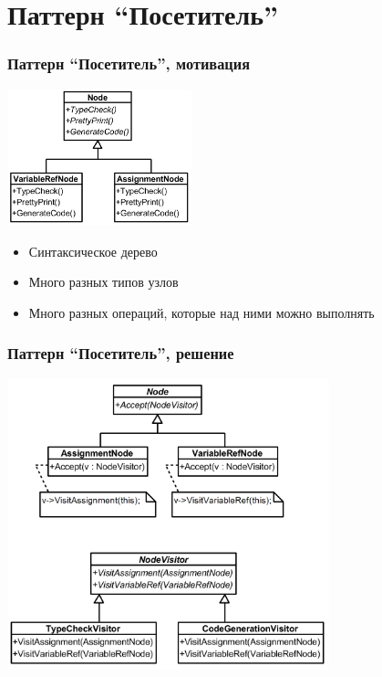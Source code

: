 \documentclass[xetex,mathserif,serif]{beamer}
\begin{document}
    \section{Паттерн ``Посетитель''}

    \begin{frame}
        \frametitle{Паттерн ``Посетитель'', мотивация}
        \begin{center}
            \includegraphics[width=0.4\textwidth]{visitorExample.png}
        \end{center}
        \begin{itemize}
            \item Синтаксическое дерево
            \item Много разных типов узлов
            \item Много разных операций, которые над ними можно выполнять
        \end{itemize}
    \end{frame}

    \begin{frame}
        \frametitle{Паттерн ``Посетитель'', решение}
        \begin{center}
            \includegraphics[width=0.7\textwidth]{visitorExampleSolution.png}
        \end{center}
    \end{frame}
\end{document}
